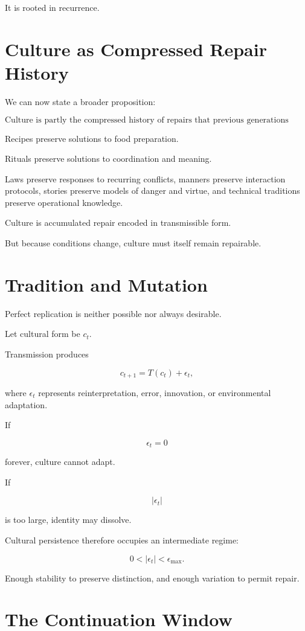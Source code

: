 \documentclass[11pt,oneside]{book}
\theoremstyle{definition}
\theoremstyle{remark}
\begin{document}
It is rooted in recurrence.

\section{Culture as Compressed Repair History}

We can now state a broader proposition:

\[
\boxed{
\text{Culture is partly the compressed history of repairs that previous generations found worth repeating.}
}
\]

Recipes preserve solutions to food preparation.

Rituals preserve solutions to coordination and meaning.

Laws preserve responses to recurring conflicts, manners preserve interaction protocols, stories preserve models of danger and virtue, and technical traditions preserve operational knowledge.

Culture is accumulated repair encoded in transmissible form.

But because conditions change, culture must itself remain repairable.

\section{Tradition and Mutation}

Perfect replication is neither possible nor always desirable.

Let cultural form be \(c_t\).

Transmission produces

\[
c_{t+1}
=
T(c_t)+\epsilon_t,
\]

where \(\epsilon_t\) represents reinterpretation, error, innovation, or environmental adaptation.

If

\[
\epsilon_t=0
\]

forever, culture cannot adapt.

If

\[
|\epsilon_t|
\]

is too large, identity may dissolve.

Cultural persistence therefore occupies an intermediate regime:

\[
0<|\epsilon_t|<\epsilon_{\max}.
\]

Enough stability to preserve distinction, and enough variation to permit repair.

\section{The Continuation Window}
\end{document}
